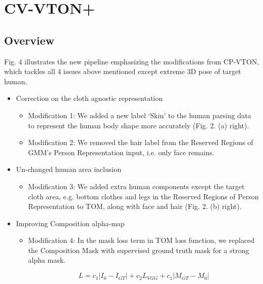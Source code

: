 \documentclass[runningheads]{llncs}
\begin{document}
\section{CV-VTON+} \label{section:cpvton+}

\subsection{Overview} 

Fig. 4 illustrates the new pipeline emphasizing the modifications from CP-VTON, which tackles all 4 issues above mentioned except extreme 3D pose of target human.

\begin{itemize}

\item Correction on the cloth agnostic representation   


\begin{itemize}

\item Modification 1: We added a new label ‘Skin’ to the human parsing data to represent the human body shape more accurately (Fig. 2. (a) right).

\item Modification 2: We removed the hair label from the Reserved Regions of GMM’s Person Representation input, i.e. only face remains.  

\end{itemize}


\item Un-changed human area inclusion  

\begin{itemize}
\item Modification 3: We added extra human components except the target cloth area, e.g. bottom clothes and legs in the Reserved Regions of Person Representation to TOM, along with face and hair (Fig. 2. (b) right).

\end{itemize}

\item Improving Composition alpha-map 


\begin{itemize}

\item Modification 4: In the mask loss term in TOM loss function, we replaced the Composition Mask with supervised ground truth mask for a strong alpha mask.

\begin{equation}
L=c_1 |I_0-I_{GT} |+  c_2 L_{VGG}+c_1 |M_{GT}-M_0 |       
\end{equation}


\end{itemize}
\end{itemize}
\end{document}
